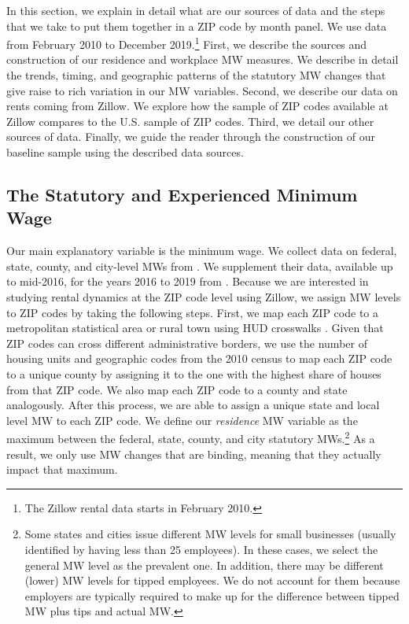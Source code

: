 
In this section, we explain in detail what are our sources of data and the steps that 
we take to put them together in a ZIP code by month panel. We use data from February 
2010 to December 2019.\footnote{The Zillow rental data starts in February 2010.} 
First, we describe the sources and construction of our residence and workplace MW measures. 
We describe in detail the trends, timing, and geographic patterns of the statutory MW changes 
that give raise to rich variation in our MW variables. Second, we describe our data on rents 
coming from Zillow. We explore how the sample of ZIP codes available at Zillow compares to the 
U.S. sample of ZIP codes. Third, we detail our other sources of data. Finally, we guide 
the reader through the construction of our baseline sample using the described data sources.

\subsection{The Statutory and Experienced Minimum Wage}\label{sec:mw_construction}

Our main explanatory variable is the minimum wage. We collect data on federal, state, 
county, and city-level MWs from \textcite{VaghulZipperer2016}. We supplement their data,
available up to mid-2016, for the years 2016 to 2019 from \textcite{BerkeleyLaborCenter}. 
Because we are interested in studying rental dynamics at the ZIP code level using Zillow, 
we assign MW levels to ZIP codes by taking the following steps. First, we map each ZIP code 
to a metropolitan statistical area or rural town using HUD crosswalks \parencite{hudCrosswalks}. 
Given that ZIP codes can cross different administrative borders, we use the number of housing 
units and geographic codes  from the 2010 census to map each ZIP code to a unique county by 
assigning it to the one with the highest share of houses from that ZIP code. We also map each 
ZIP code to a county and state analogously. After this process, we are able to assign a unique 
state and local level MW to each ZIP code. We define our \textit{residence} MW variable as 
the maximum between the federal, state, county, and city statutory MWs.\footnote{Some states 
	and cities issue different MW levels for small businesses (usually identified by having 
	less than 25 employees). In these cases, we select the general MW level as the prevalent 
	one. In addition, there may be different (lower) MW levels for tipped employees. We do not 
	account for them because employers are typically required to make up for the difference 
	between tipped MW plus tips and actual MW.}
As a result, we only use MW changes that are binding, meaning that they actually impact 
that maximum.

